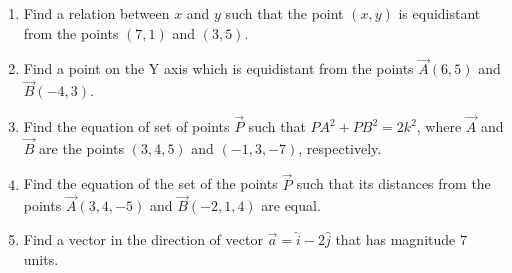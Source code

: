 \begin{enumerate}[label=\thesubsection.\arabic*, ref=\thesubsection.\theenumi]
\item Find a relation between $x$ and $y$ such that the point $(x,y)$ is equidistant from the points $(7,1)$ and $(3,5)$.
\item Find a point on the Y axis which is equidistant from the points $\vec{A}(6,5)$ and $\vec{B}(-4,3)$.
\item Find the equation of set of points $\vec{P}$ such that $PA^2+PB^2=2k^2$, where $\vec{A}$ and $\vec{B}$ are the points $(3,4,5)$ and $(-1,3,-7)$, respectively.
\item Find the equation of the set of the points $\vec{P}$ such that its distances from the points $\vec{A}(3,4,-5)$ and $\vec{B}(-2,1,4)$ are equal.
\item Find a vector in the direction of vector $\overrightarrow{a}=\hat{i} -2\hat{j}$ that has magnitude $7$ units.
\end{enumerate}
